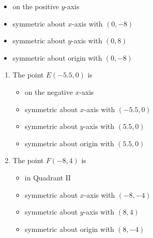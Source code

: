 \begin{enumerate}
\begin{multicols}{2}
\begin{enumerate}
\begin{itemize}

\item on the positive $y$-axis
\item symmetric about $x$-axis with $(0, -8)$
\item symmetric about $y$-axis with $(0, 8)$
\item symmetric about origin with $(0, -8)$

\end{itemize}


\setcounter{HWindent}{\value{enumii}}
\end{enumerate}
\end{multicols}

\begin{multicols}{2}
\begin{enumerate}
\setcounter{enumii}{\value{HWindent}}

\item The point $E(-5.5, 0)$ is 

\begin{itemize}

\item on the negative $x$-axis
\item symmetric about $x$-axis with $(-5.5, 0)$
\item symmetric about $y$-axis with $(5.5, 0)$
\item symmetric about origin with $(5.5, 0)$

\end{itemize}

\item The point $F(-8, 4)$ is 

\begin{itemize}

\item in Quadrant II
\item symmetric about $x$-axis with $(-8, -4)$
\item symmetric about $y$-axis with $(8, 4)$
\item symmetric about origin with $(8, -4)$

\end{itemize}

\setcounter{HWindent}{\value{enumii}}
\end{enumerate}
\end{multicols}

\begin{multicols}{2}
\begin{enumerate}
\setcounter{enumii}{\value{HWindent}}


\end{enumerate}
\end{multicols}
\end{enumerate}
